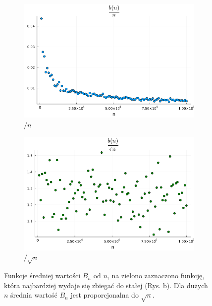 \documentclass{article}
\begin{document}
\begin{figure}[h]
    \centering
    \begin{subfigure}[b]{0.49\textwidth}
        \centering
        \includegraphics[width=1.0\textwidth]{../results/b(n)_1.png}
        \caption{$/ n$}
    \end{subfigure}
    \begin{subfigure}[b]{0.49\textwidth}
        \centering
        \includegraphics[width=1.0\textwidth]{../results/b(n)_2.png}
        \caption{$/ \sqrt{n}$}
    \end{subfigure}
    \caption{Funkcje średniej wartości $B_n$ od $n$, na zielono zaznaczono funkcję, która najbardziej wydaje się zbiegać do stałej (Rys. b). Dla dużych $n$ średnia wartość $B_n$ jest proporcjonalna do $\sqrt{n}$.}
\end{figure}
\end{document}
